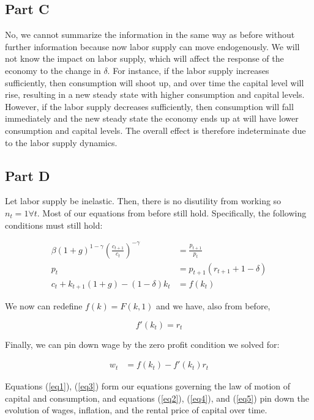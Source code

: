 \documentclass[11pt]{article} %
\begin{document}
\subsection{Part C}
No, we cannot summarize the information in the same way as before without further information because now labor supply can move endogenously. We will not know the impact on labor supply, which will affect the response of the economy to the change in $\delta$. For instance, if the labor supply increases sufficiently, then consumption will shoot up, and over time the capital level will rise, resulting in a new steady state with higher consumption and capital levels. However, if the labor supply decreases sufficiently, then consumption will fall immediately and the new steady state the economy ends up at will have lower consumption and capital levels. The overall effect is therefore indeterminate due to the labor supply dynamics.


\subsection{Part D}

Let labor supply be inelastic. Then, there is no disutility from working so $n_t = 1 \forall t.$ Most of our equations from before still hold. Specifically, the following conditions must still hold:

\begin{align}
\beta (1+g)^{1-\gamma}\left( \frac{c_{t+1}}{c_t}\right)^{-\gamma} &= \frac{p_{t+1}}{p_t} \label{eq1} \\
p_t &= p_{t+1}(r_{t+1} + 1-\delta) \label{eq2}\\ 
c_t + k_{t+1}(1+g) - (1-\delta)k_{t} &= f(k_t) \label{eq3}
\end{align}

We now can redefine $f(k) = F (k,1)$ and we have, also from before,

\begin{equation}
f'(k_t) = r_t \label{eq4}
\end{equation}

Finally, we can pin down wage by the zero profit condition we solved for:

\begin{align}
w_t &= f(k_t)  - f'(k_t)r_t \label{eq5}
\end{align}

Equations (\ref{eq1}), (\ref{eq3}) form our equations governing the law of motion of capital and consumption, and equations (\ref{eq2}), (\ref{eq4}), and (\ref{eq5}) pin down the evolution of wages, inflation, and the rental price of capital over time.
\end{document}
